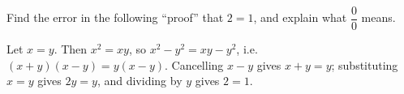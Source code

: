 Find the error in the following ``proof'' that $2=1$, and explain what $\dfrac{0}{0}$ means.

Let $x=y$. Then $x^2=xy$, so $x^2-y^2=xy-y^2$, i.e. $(x+y)(x-y)=y(x-y)$. Cancelling $x-y$ gives $x+y=y$; substituting $x=y$ gives $2y=y$, and dividing by $y$ gives $2=1$.
